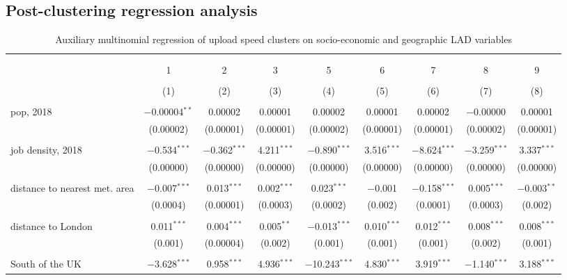 \documentclass[]{interact}
\theoremstyle{plain}%
\theoremstyle{definition}
\theoremstyle{remark}
\begin{document}
\hypertarget{sec:4.2}{%
\subsection{Post-clustering regression analysis}\label{sec:4.2}}

\begin{table} \centering 
  \caption{Auxiliary multinomial regression of upload speed clusters on socio-economic and geographic LAD variables\label{aux}} 
  \label{} 
\tiny 
\begin{tabular}{@{\extracolsep{5pt}}lcccccccc} 
\\[-1.8ex]\hline 
\hline \\[-1.8ex] 
\\[-1.8ex] & 1 & 2 & 3 & 5 & 6 & 7 & 8 & 9 \\ 
\\[-1.8ex] & (1) & (2) & (3) & (4) & (5) & (6) & (7) & (8)\\ 
\hline \\[-1.8ex] 
 pop, 2018 & $-$0.00004$^{**}$ & 0.00002 & 0.00001 & 0.00002 & 0.00001 & 0.00002 & $-$0.00000 & 0.00001 \\ 
  & (0.00002) & (0.00001) & (0.00001) & (0.00002) & (0.00001) & (0.00001) & (0.00002) & (0.00001) \\ 
  & & & & & & & & \\ 
 job density, 2018 & $-$0.534$^{***}$ & $-$0.362$^{***}$ & 4.211$^{***}$ & $-$0.890$^{***}$ & 3.516$^{***}$ & $-$8.624$^{***}$ & $-$3.259$^{***}$ & 3.337$^{***}$ \\ 
  & (0.00000) & (0.00000) & (0.00000) & (0.00000) & (0.00000) & (0.00000) & (0.00000) & (0.00000) \\ 
  & & & & & & & & \\ 
 distance to nearest met. area & $-$0.007$^{***}$ & 0.013$^{***}$ & 0.002$^{***}$ & 0.023$^{***}$ & $-$0.001 & $-$0.158$^{***}$ & 0.005$^{***}$ & $-$0.003$^{**}$ \\ 
  & (0.0004) & (0.00001) & (0.0003) & (0.0002) & (0.002) & (0.0001) & (0.0003) & (0.002) \\ 
  & & & & & & & & \\ 
 distance to London & 0.011$^{***}$ & 0.004$^{***}$ & 0.005$^{**}$ & $-$0.013$^{***}$ & 0.010$^{***}$ & 0.012$^{***}$ & 0.008$^{***}$ & 0.008$^{***}$ \\ 
  & (0.001) & (0.00004) & (0.002) & (0.001) & (0.001) & (0.001) & (0.002) & (0.001) \\ 
  & & & & & & & & \\ 
 South of the UK & $-$3.628$^{***}$ & 0.958$^{***}$ & 4.936$^{***}$ & $-$10.243$^{***}$ & 4.830$^{***}$ & 3.919$^{***}$ & $-$1.140$^{***}$ & 3.188$^{***}$ \\ 

\end{tabular}
\end{table}
\end{document}
